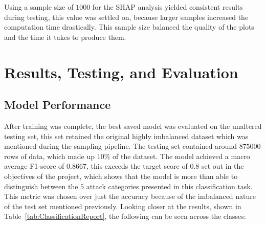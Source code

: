 \documentclass[11pt,a4paper]{article}
\begin{document}
Using a sample size of $1000$ for the SHAP analysis yielded consistent results during testing, this value was settled on, because larger samples increased the computation time drastically. This sample size balanced the quality of the plots and the time it takes to produce them.
\section{Results, Testing, and Evaluation}
\subsection{Model Performance}
After training was complete, the best saved model was evaluated on the unaltered testing set, this set retained the original highly imbalanced dataset which was mentioned during the sampling pipeline. The testing set contained around $875000$ rows of data, which made up $10\%$ of the dataset.
The model achieved a macro average F1-score of $0.8667$, this exceeds the target score of $0.8$ set out in the objectives of the project, which shows that the model is more than able to distinguish between the $5$ attack categories presented in this classification task. This metric was chosen over just the accuracy because of the imbalanced nature of the test set mentioned previously. Looking closer at the results, shown in Table~\ref{tab:ClassificationReport}, the following can be seen across the classes:
\end{document}

